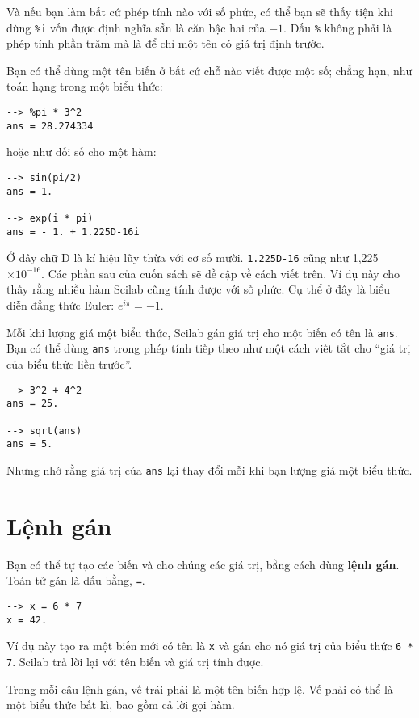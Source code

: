 \documentclass[12pt]{book}
\begin{document}
Và nếu bạn làm bất cứ phép tính nào với số phức, có thể bạn sẽ thấy tiện
khi dùng {\tt \%i} vốn được định nghĩa sẵn là căn bậc hai của $-1$.
Dấu \verb#%# không phải là phép tính phần trăm mà là để chỉ một
tên có giá trị định trước.

Bạn có thể dùng một tên biến ở bất cứ chỗ nào viết được một số; chẳng hạn,
như toán hạng trong một biểu thức:

\begin{verbatim}
--> %pi * 3^2
ans = 28.274334
\end{verbatim}
%
\noindent hoặc như đối số cho một hàm:

\begin{verbatim}
--> sin(pi/2)
ans = 1.

--> exp(i * pi)
ans = - 1. + 1.225D-16i
\end{verbatim}
%
Ở đây chữ D là kí hiệu lũy thừa với cơ số mười. \texttt{1.225D-16}
cũng như 1,225 $\times 10^{-16}$. Các phần sau của cuốn sách
sẽ đề cập về cách viết trên.
Ví dụ này cho thấy rằng nhiều hàm Scilab cũng tính được
với số phức. Cụ thể ở đây là biểu diễn đẳng thức Euler:
$e^{i \pi} = -1$.

Mỗi khi lượng giá một biểu thức, Scilab gán giá trị cho một biến
có tên là {\tt ans}.  Bạn có thể dùng {\tt ans} trong phép tính tiếp
theo như một cách viết tắt cho ``giá trị của biểu thức liền trước''.

\begin{verbatim}
--> 3^2 + 4^2
ans = 25.

--> sqrt(ans)
ans = 5.
\end{verbatim}
%
Nhưng nhớ rằng giá trị của {\tt ans} lại thay đổi mỗi khi bạn lượng
giá một biểu thức.


\section{Lệnh gán}

Bạn có thể tự tạo các biến và cho chúng các giá trị, bằng cách dùng
{\bf lệnh gán}. Toán tử gán là dấu bằng, {\tt =}.

\begin{verbatim}
--> x = 6 * 7
x = 42.
\end{verbatim}
%
Ví dụ này tạo ra một biến mới có tên là {\tt x} và gán cho nó giá trị
của biểu thức {\tt 6 * 7}.  Scilab trả lời lại với tên biến và
giá trị tính được.

Trong mỗi câu lệnh gán, vế trái phải là một tên biến hợp lệ. Vế phải
có thể là một biểu thức bất kì, bao gồm cả lời gọi hàm.
\end{document}
